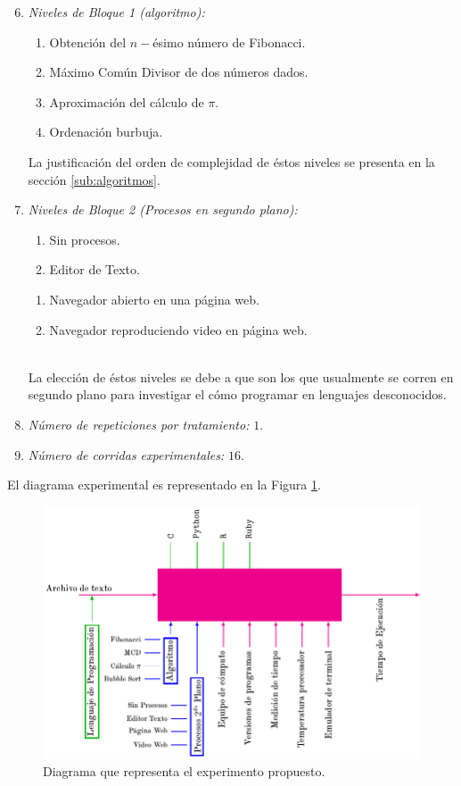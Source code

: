 \documentclass[11pt,a4paper]{article}
\begin{document}
\begin{enumerate}
	\setcounter{enumi}{5}
\item \textit{Niveles de Bloque 1 (algoritmo):}
	\begin{enumerate}
		\item Obtención del \(n-\)ésimo número de Fibonacci.
		\item Máximo Común Divisor de dos números dados.
		\item Aproximación del cálculo de \(\pi\).
		\item Ordenación burbuja.
	\end{enumerate}
		La justificación del orden de complejidad de éstos niveles se presenta en la sección \ref{sub:algoritmos}.
	\item \textit{Niveles de Bloque 2 (Procesos en segundo plano):}\\[2mm]
		\begin{minipage}{0.3\linewidth}
			\begin{enumerate}[noitemsep]
				\item Sin procesos.
				\item Editor de Texto.
			\end{enumerate}
		\end{minipage}\hspace{5mm}
		\begin{minipage}{0.7\linewidth}
			\begin{enumerate}[noitemsep]
				\item Navegador abierto en una página web.
				\item Navegador reproduciendo video en página web.
			\end{enumerate}
		\end{minipage}\\[2mm]
		La elección de éstos niveles se debe a que son los que usualmente se corren en segundo plano para investigar el cómo programar en lenguajes desconocidos.
	\item \textit{Número de repeticiones por tratamiento:} \(1\).
	\item \textit{Número de corridas experimentales:} \(16\).
\end{enumerate}
El diagrama experimental es representado en la Figura \ref{fig:diagrama_dcl}.
\newpage
\begin{figure}[hbt!]
	\centering
	\includegraphics[width = 0.8\linewidth]{IMAGENES/2/tikz.pdf}
	\caption{Diagrama que representa el experimento propuesto.}
	\label{fig:diagrama_dcl}
\end{figure}
\end{document}
